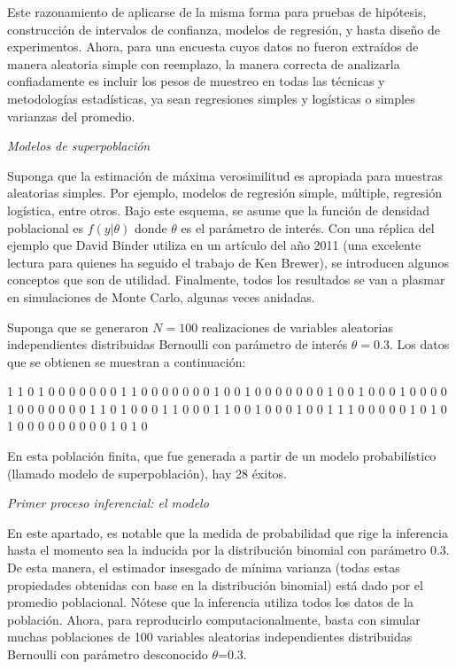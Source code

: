 \documentclass[
  spanish,
  12pt,
]{book}
\begin{document}
Este razonamiento de aplicarse de la misma forma para pruebas de hipótesis, construcción de intervalos de confianza, modelos de regresión, y hasta diseño de experimentos. Ahora, para una encuesta cuyos datos no fueron extraídos de manera aleatoria simple con reemplazo, la manera correcta de analizarla confiadamente es incluir los pesos de muestreo en todas las técnicas y metodologías estadísticas, ya sean regresiones simples y logísticas o simples varianzas del promedio.

\emph{Modelos de superpoblación}

Suponga que la estimación de máxima verosimilitud es apropiada para muestras aleatorias simples. Por ejemplo, modelos de regresión simple, múltiple, regresión logística, entre otros. Bajo este esquema, se asume que la función de densidad poblacional es \(f(y | \theta)\) donde \(\theta\) es el parámetro de interés. Con una réplica del ejemplo que David Binder utiliza en un artículo del año 2011 (una excelente lectura para quienes ha seguido el trabajo de Ken Brewer), se introducen algunos conceptos que son de utilidad. Finalmente, todos los resultados se van a plasmar en simulaciones de Monte Carlo, algunas veces anidadas.

Suponga que se generaron \(N=100\) realizaciones de variables aleatorias independientes distribuidas Bernoulli con parámetro de interés \(\theta=0.3\). Los datos que se obtienen se muestran a continuación:

1 1 0 1 0 0 0 0 0 0 0 1 1 0 0 0 0 0 0 0 1 0 0 1 0 0 0 0 0 0 0 1 0
0 1 0 0 0 1 0 0 0 0 1 0 0 0 0 0 0 0 1 1 0 1 0 0 0 1 1 0 0 0 1 1 0
0 1 0 0 0 1 0 0 1 1 1 0 0 0 0 0 1 0 1 0 1 0 0 0 0 0 0 0 0 0 1 0 1 0

En esta población finita, que fue generada a partir de un modelo probabilístico (llamado modelo de superpoblación), hay 28 éxitos.

\emph{Primer proceso inferencial: el modelo}

En este apartado, es notable que la medida de probabilidad que rige la inferencia hasta el momento sea la inducida por la distribución binomial con parámetro 0.3. De esta manera, el estimador insesgado de mínima varianza (todas estas propiedades obtenidas con base en la distribución binomial) está dado por el promedio poblacional. Nótese que la inferencia utiliza todos los datos de la población. Ahora, para reproducirlo computacionalmente, basta con simular muchas poblaciones de 100 variables aleatorias independientes distribuidas Bernoulli con parámetro desconocido \(\theta\)=0.3.
\end{document}

